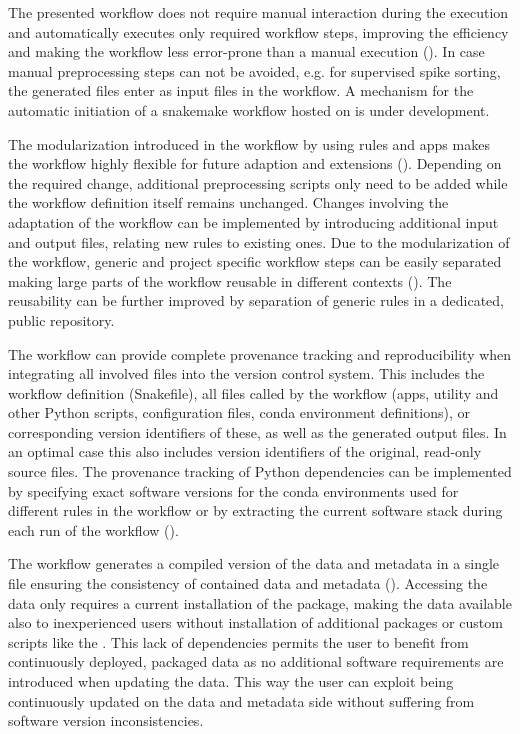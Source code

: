 The presented workflow does not require manual interaction during the execution and automatically executes only required workflow steps, improving the efficiency and making the workflow less error-prone than a manual execution (). In case manual preprocessing steps can not be avoided, e.g. for supervised spike sorting, the generated files enter as input files in the workflow. A mechanism for the automatic initiation of a snakemake workflow hosted on  is under development.

The modularization introduced in the workflow by using  rules and apps makes the workflow highly flexible for future adaption and extensions (). Depending on the required change, additional preprocessing scripts only need to be added while the workflow definition itself remains unchanged. Changes involving the adaptation of the workflow can be implemented by introducing additional input and output files, relating new  rules to existing ones.
Due to the modularization of the workflow, generic and project specific workflow steps can be easily separated making large parts of the workflow reusable in different contexts (). The reusability can be further improved by separation of generic rules in a dedicated, public repository.

The workflow can provide complete provenance tracking and reproducibility when integrating all involved files into the version control system. This includes the workflow definition (Snakefile), all files called by the workflow (apps, utility and other Python scripts, configuration files, conda environment definitions), or corresponding version identifiers of these,  as well as the generated output files. In an optimal case this also includes version identifiers of the original, read-only source files. The provenance tracking of Python dependencies can be implemented by specifying exact software versions for the conda environments used for different rules in the workflow or by extracting the current software stack during each run of the workflow ().

The workflow generates a compiled version of the data and metadata in a single  file ensuring the consistency of contained data and metadata (). Accessing the data only requires a current installation of the  package, making the data available also to inexperienced users without installation of additional packages or custom scripts like the . This lack of dependencies permits the user to benefit from continuously deployed, packaged data as no additional software requirements are introduced when updating the data. This way the user can exploit being continuously updated on the data and metadata side without suffering from software version inconsistencies.

